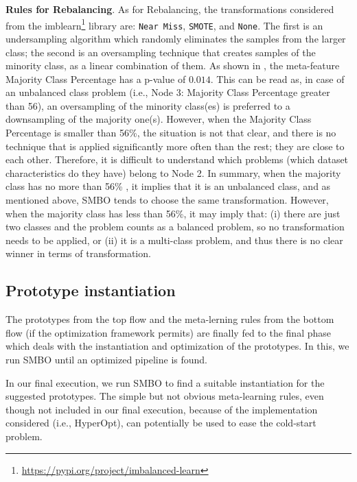 \begin{example}
\textbf{Rules for Rebalancing}. As for Rebalancing, the transformations considered from the imblearn\footnote{\url{https://pypi.org/project/imbalanced-learn}} library are: \texttt{Near Miss}, \texttt{SMOTE}, and \texttt{None}.
The first is an undersampling algorithm which randomly eliminates the samples from the larger class; the second is an oversampling technique that creates samples of the minority class, as a linear combination of them.
As shown in , the meta-feature Majority Class Percentage has a p-value of $0.014$.
This can be read as, in case of an unbalanced class problem (i.e., Node 3: Majority Class Percentage greater than 56), an oversampling of the minority class(es) is preferred to a downsampling of the majority one(s).
However, when the Majority Class Percentage is smaller than 56\%, the situation is not that clear, and there is no technique that is applied significantly more often than the rest; they are close to each other.
Therefore, it is difficult to understand which problems (which dataset characteristics do they have) belong to Node 2.
In summary, when the majority class has no more than 56\% , it implies that it is an unbalanced class, and as mentioned above, SMBO tends to choose the same transformation.
However, when the majority class has less than 56\%, it may imply that: (i) there are just two classes and the problem counts as a balanced problem, so no transformation needs to be applied, or (ii) it is a multi-class problem, and thus there is no clear winner in terms of transformation.
\end{example}

\subsection{Prototype instantiation}
\label{effective-ssec:prototype-insta}

The prototypes from the top flow and the meta-lerning rules from the bottom flow (if the optimization framework permits) are finally fed to the final phase which deals with the instantiation and optimization of the prototypes. In this, we run SMBO until an optimized pipeline is found.

\begin{example}
 In our final execution, we run SMBO to find a suitable instantiation for the suggested prototypes. The simple but not obvious meta-learning rules, even though not included in our final execution, because of the implementation considered (i.e., HyperOpt), can potentially be used to ease the cold-start problem.
\end{example}

